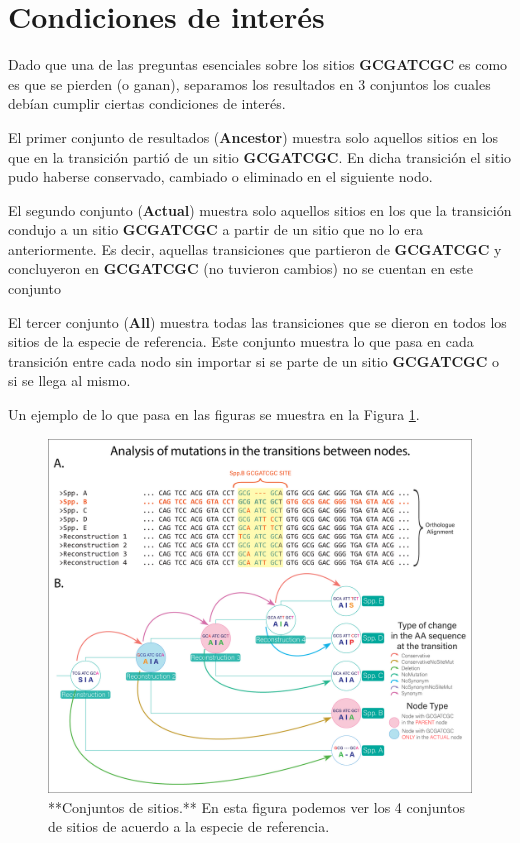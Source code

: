 \documentclass[
]{book}
\begin{document}
\hypertarget{condiciones-de-interuxe9s}{%
\section{Condiciones de interés}\label{condiciones-de-interuxe9s}}

Dado que una de las preguntas esenciales sobre los sitios \textbf{GCGATCGC} es como es que se pierden (o ganan), separamos los resultados en 3 conjuntos los cuales debían cumplir ciertas condiciones de interés.

El primer conjunto de resultados (\textbf{Ancestor}) muestra solo aquellos sitios en los que en la transición partió de un sitio \textbf{GCGATCGC}. En dicha transición el sitio pudo haberse conservado, cambiado o eliminado en el siguiente nodo.

El segundo conjunto (\textbf{Actual}) muestra solo aquellos sitios en los que la transición condujo a un sitio \textbf{GCGATCGC} a partir de un sitio que no lo era anteriormente. Es decir, aquellas transiciones que partieron de \textbf{GCGATCGC} y concluyeron en \textbf{GCGATCGC} (no tuvieron cambios) no se cuentan en este conjunto

El tercer conjunto (\textbf{All}) muestra todas las transiciones que se dieron en todos los sitios de la especie de referencia. Este conjunto muestra lo que pasa en cada transición entre cada nodo sin importar si se parte de un sitio \textbf{GCGATCGC} o si se llega al mismo.

Un ejemplo de lo que pasa en las figuras se muestra en la Figura \ref{fig:FIG4}.

\begin{figure}

{\centering \includegraphics[width=1\linewidth]{Clados/Calothrix_B/figures/Reconstruction_explanation} 

}

\caption{**Conjuntos de sitios.** En esta figura podemos ver los 4 conjuntos de sitios de acuerdo a la especie de referencia.}\label{fig:FIG4}
\end{figure}
\end{document}
